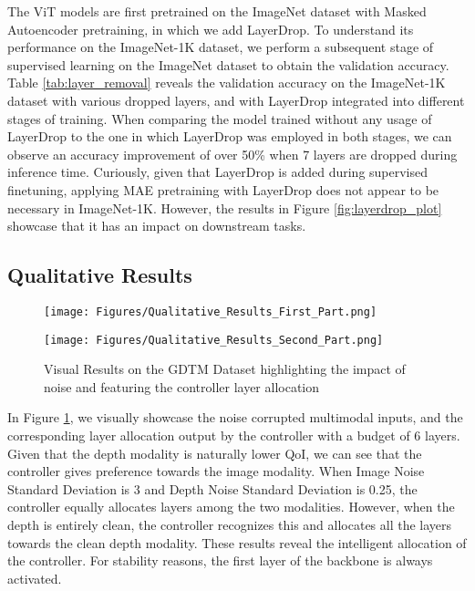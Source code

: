 The ViT models are first pretrained on the ImageNet dataset with Masked Autoencoder pretraining, in which we add LayerDrop. To understand its performance on the ImageNet-1K dataset, we perform a subsequent stage of supervised learning on the ImageNet dataset to obtain the validation accuracy. Table \ref{tab:layer_removal} reveals the validation accuracy on the ImageNet-1K dataset with various dropped layers, and with LayerDrop integrated into different stages of training. When comparing the model trained without any usage of LayerDrop to the one in which LayerDrop was employed in both stages, we can observe an accuracy improvement of over 50\% when 7 layers are dropped during inference time. Curiously, given that LayerDrop is added during supervised finetuning, applying MAE pretraining with LayerDrop does not appear to be necessary in ImageNet-1K. However, the results in Figure \ref{fig:layerdrop_plot} showcase that it has an impact on downstream tasks. 

\subsection{Qualitative Results}

\begin{figure}[h]
    \centering
    \texttt{[image: Figures/Qualitative\_Results\_First\_Part.png]}
\end{figure}
\begin{figure}[h]
    \centering
    \texttt{[image: Figures/Qualitative\_Results\_Second\_Part.png]}
    \caption{Visual Results on the GDTM Dataset highlighting the impact of noise and featuring the controller layer allocation}
    \label{fig:qualitative}
\end{figure}

In Figure \ref{fig:qualitative}, we visually showcase the noise corrupted multimodal inputs, and the corresponding layer allocation output by the \name controller with a budget of 6 layers. Given that the depth modality is naturally lower QoI, we can see that the controller gives preference towards the image modality. When Image Noise Standard Deviation is 3 and Depth Noise Standard Deviation is 0.25, the controller equally allocates layers among the two modalities. However, when the depth is entirely clean, the controller recognizes this and allocates all the layers towards the clean depth modality. These results reveal the intelligent allocation of the \name controller. For stability reasons, the first layer of the backbone is always activated. 

